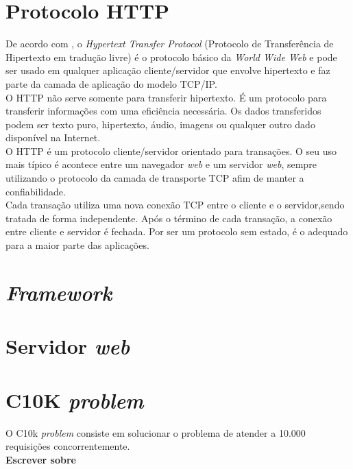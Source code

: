 \section{Protocolo HTTP}
De acordo com , o \textit{Hypertext Transfer 
Protocol} (Protocolo de Transferência de Hipertexto em tradução livre) é o 
protocolo básico da \textit{World Wide Web} e pode ser usado em qualquer 
aplicação cliente/servidor que envolve hipertexto e faz parte da camada de 
aplicação do modelo TCP/IP.\\
O HTTP não serve somente para transferir hipertexto. É um protocolo para transferir informações com uma eficiência necessária. Os dados transferidos podem ser texto puro, hipertexto, áudio, imagens ou qualquer outro dado disponível na Internet.\\
O HTTP é um protocolo cliente/servidor orientado para transações. O seu uso 
mais típico é acontece entre um navegador \textit{web} e um servidor 
\textit{web}, sempre utilizando o protocolo da camada de transporte TCP afim de 
manter a confiabilidade.\\
Cada transação utiliza uma nova conexão TCP entre o cliente e o servidor,sendo 
tratada de forma independente. Após o término de cada transação, a conexão 
entre cliente e servidor é fechada. Por ser um protocolo sem estado, é o 
adequado para a maior parte das aplicações.\\
\section{\textit{Framework}}

\section{Servidor \textit{web}}

\section{C10K \textit{problem}}
O C10k \textit{problem} consiste em solucionar o problema de atender a 10.000 requisições concorrentemente.\\
\textbf{Escrever sobre}
